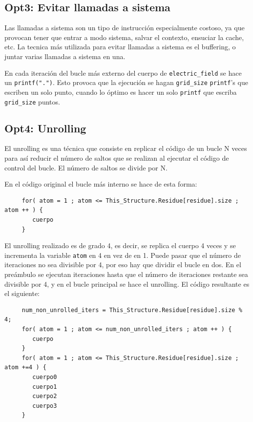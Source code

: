 \subsection{Opt3: Evitar llamadas a sistema}

Las llamadas a sistema son un tipo de instrucci\'{o}n especialmente costoso, ya
que provocan tener que entrar a modo sistema, salvar el contexto, ensuciar la
cache, etc. La tecnica m\'{a}s utilizada para evitar llamadas a sistema es el
buffering, o juntar varias llamadas a sistema en una.

En cada iteraci\'{o}n del bucle m\'{a}s externo del cuerpo de
\texttt{electric\_field} se hace un \texttt{printf(".")}. Esto provoca que
la ejecuci\'{o}n se hagan \texttt{grid\_size} \texttt{printf}'s que escriben un
solo punto, cuando lo \'{o}ptimo es hacer un solo \texttt{printf} que escriba
\texttt{grid\_size} puntos.

\subsection{Opt4: Unrolling}

El unrolling es una t\'{e}cnica que consiste en replicar el c\'{o}digo de un
bucle N veces para as\'{i} reducir el n\'{u}mero de saltos que se realizan al
ejecutar el c\'{o}digo de control del bucle. El n\'{u}mero de saltos se divide
por N.

En el c\'{o}digo original el bucle m\'{a}s interno se hace de esta forma:

\begin{lstlisting}
     for( atom = 1 ; atom <= This_Structure.Residue[residue].size ; atom ++ ) {
        cuerpo
     }
\end{lstlisting}

El unrolling realizado es de grado 4, es decir, se replica el cuerpo 4 veces y
se incrementa la variable \texttt{atom} en 4 en vez de en 1. Puede pasar que el
n\'{u}mero de iteraciones no sea divisible por 4, por eso hay que dividir el
bucle en dos. En el pre\'{a}mbulo se ejecutan iteraciones hasta que el
n\'{u}mero de iteraciones restante sea divisible por 4, y en el bucle principal
se hace el unrolling. El c\'{o}digo resultante es el siguiente:

\begin{lstlisting}
     num_non_unrolled_iters = This_Structure.Residue[residue].size % 4;
     for( atom = 1 ; atom <= num_non_unrolled_iters ; atom ++ ) {
        cuerpo
     }
     for( atom = 1 ; atom <= This_Structure.Residue[residue].size ; atom +=4 ) {
        cuerpo0
        cuerpo1
        cuerpo2
        cuerpo3
     }
\end{lstlisting}

